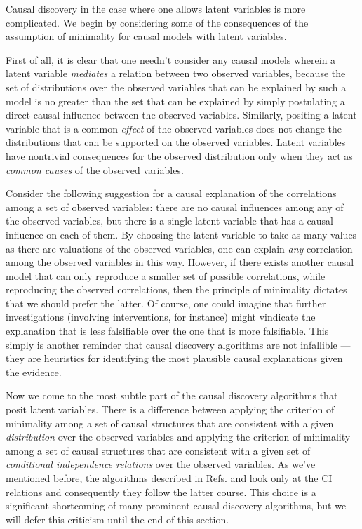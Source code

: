 \documentclass[12pt,onecolumn,nofootinbib]{revtex4-2}
\begin{document}
Causal discovery in the case where one allows latent variables is more complicated.
We begin by considering some of the consequences of the assumption of minimality for causal models with latent variables.

First of all, it is clear that one needn't consider any causal models wherein a latent variable
\emph{mediates} a relation between two observed variables, because the set of
distributions over the observed variables that can be explained by such a model is no greater
than the set that can be explained by simply postulating a direct causal
influence between the observed variables.  Similarly, positing a latent variable that is a common \emph{effect} of the observed variables does not change the distributions that can be supported on the observed variables.  Latent variables have nontrivial consequences for the observed distribution only when they act as \emph{common causes} of the observed variables.

Consider the following suggestion for a causal explanation of
the correlations among a set of observed variables: there are no causal
influences among any of the observed variables, but there is a single latent
variable that has a causal influence on each of them. By choosing the
latent variable to take as many values as there are valuations of the
observed variables, one can explain \emph{any} correlation among the
observed variables in this way. However, if there exists another causal model that
can only reproduce a smaller set of possible correlations, while reproducing
the observed correlations, then the principle of minimality dictates that we
should prefer the latter. Of course, one could imagine that further
investigations (involving interventions, for instance) might vindicate the
explanation that is less falsifiable over the one that is more falsifiable.
This simply is another reminder that causal discovery algorithms are not
infallible --- they are heuristics for identifying the most plausible causal
explanations given the evidence.

Now we come to the most subtle part of the causal discovery algorithms that posit latent variables.
There is a difference between applying the criterion of minimality among a set of causal structures that are consistent with a given \emph{distribution} over the observed variables and applying the criterion of minimality among a set of causal structures that are consistent with a given set of \emph{conditional independence relations} over the observed variables.
As we've mentioned before, the algorithms described in Refs. \cite{Pearl2009} and \cite{Spirtes2001} look only at the CI relations and consequently they follow the latter course.  This choice is a significant shortcoming of many prominent causal discovery algorithms, but we will defer this criticism until the end of this section.
\end{document}

